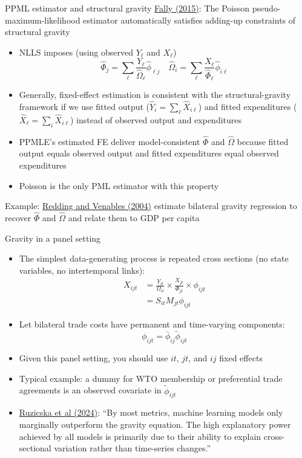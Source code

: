 \documentclass[10pt,notes=hide,aspectratio=169]{beamer}
\begin{document}
\begin{frame}{PPML estimator and structural gravity}
\href{https://doi.org/10.1016/j.jinteco.2015.05.005}{Fally (2015)}:
The Poisson pseudo-maximum-likelihood estimator automatically satisfies adding-up constraints of structural gravity
\begin{itemize}
\item 
NLLS imposes (using observed $Y_{\ell}$ and $X_{\ell}$)
\begin{equation*}
\hat{\Phi}_j = \sum_{\ell} \frac{Y_{\ell}}{\hat{\Omega}_{\ell}} \hat{\phi}_{\ell j}
\quad
\hat{\Omega}_i = \sum_{\ell} \frac{X_{\ell}}{\hat{\Phi}_{\ell}} \hat{\phi}_{i \ell}
\end{equation*}
\item 
Generally, fixed-effect estimation is consistent with the structural-gravity framework
if we use fitted output ($\hat{Y}_{i} = \sum_{\ell} \hat{X}_{i\ell}$) and fitted expenditures ($\hat{X}_{\ell} = \sum_{i} \hat{X}_{i\ell}$)
instead of observed output and expenditures
\item 
PPMLE's estimated FE deliver model-consistent $\hat{\Phi}$ and $\hat{\Omega}$ because
fitted output equals observed output and fitted expenditures equal observed expenditures
\item
Poisson is the only PML estimator with this property
\end{itemize}
Example:
\href{https://ideas.repec.org/a/eee/inecon/v62y2004i1p53-82.html}{Redding and Venables (2004)}
estimate bilateral gravity regression to recover $\hat{\Phi}$ and $\hat{\Omega}$
and relate them to GDP per capita
\end{frame}
\begin{frame}{Gravity in a panel setting}
\begin{itemize}
\item The simplest data-generating process is repeated cross sections
(no state variables, no intertemporal links):
\begin{align*}
X_{ijt} 
&=
\frac{Y_{it}}{\Omega_{it}} \times \frac{X_{jt}}{\Phi_{jt}} \times \phi_{ijt}
\\
&=
S_{it} M_{jt} \phi_{ijt}
\end{align*}
\item Let bilateral trade costs have permanent and time-varying components:
$$
\phi_{ijt} = \bar{\phi}_{ij} \tilde{\phi}_{ijt}
$$
\item Given this panel setting, you should use $it$, $jt$, and $ij$ fixed effects
\item Typical example: a dummy for WTO membership or preferential trade agreements is an observed covariate in $\tilde{\phi}_{ijt}$
\item {\small \href{https://doi.org/10.1007/978-3-031-49849-7_16}{Ruzicska et al (2024)}: ``By most metrics, machine learning models only marginally outperform the gravity equation. The high explanatory power achieved by all models is primarily due to their ability to explain cross-sectional variation rather than time-series changes.''\par}
\end{itemize}
\end{frame}
\end{document}
